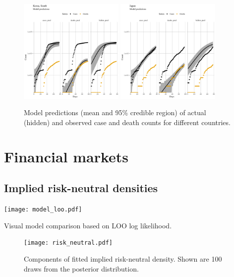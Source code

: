 \documentclass[a4paper]{tufte-handout}
\begin{document}
\begin{figure}
\begin{center}
    \includegraphics[width=0.45\textwidth]{figs/model_pred_KOR.pdf}
    \includegraphics[width=0.45\textwidth]{figs/model_pred_JPN.pdf}
  \end{center}
  \caption{\label{fig:modelpred} Model predictions (mean and 95\%
    credible region) of actual (hidden) and observed case and death
    counts for different countries.}
\end{figure}

\section{Financial markets}

\subsection{Implied risk-neutral densities}

\begin{marginfigure}
  \begin{center}
    \texttt{[image: model\_loo.pdf]}
  \end{center}
  \caption{Visual model comparison based on LOO log likelihood.}
\end{marginfigure}

\begin{figure}
  \begin{center}
    \texttt{[image: risk\_neutral.pdf]}
  \end{center}
  \caption{Components of fitted implied risk-neutral density. Shown
    are 100 draws from the posterior distribution.}
\end{figure}
\end{document}
